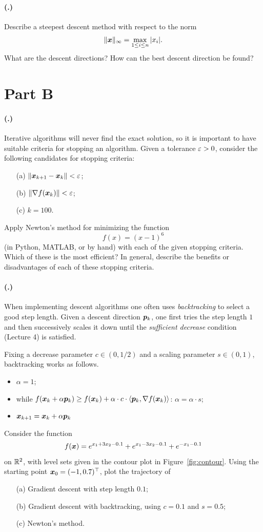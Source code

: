 \documentclass{article}
\newcounter{problemSheetNumber}
\newcounter{problems}
\renewcommand{\problem}{\paragraph{(\theproblemSheetNumber.\theproblems)}\addtocounter{problems}{1}}
\begin{document}
 \problem Describe a steepest descent method with respect to the norm 
 \begin{equation*}
  \Vert {\bm{x}}\Vert_{\infty} = \max_{1\leq i\leq n} |x_i|.
 \end{equation*}
What are the descent directions? How can the best descent direction be found?
 
\section*{Part B}

\problem Iterative algorithms will never find the exact solution, so it is important to have suitable criteria for stopping an algorithm. Given a tolerance $\varepsilon>0$, consider the following candidates for stopping criteria:
\begin{itemize}
 \item[(a)] $\Vert {\bm{x}_{k+1}-\bm{x}_k}\Vert<\varepsilon$;
 \item[(b)] $\Vert {\nabla f(\bm{x}_k)}\Vert<\varepsilon$;
 \item[(c)] $k=100$.
\end{itemize}
Apply Newton's method for minimizing the function
\begin{equation*}
 f(x) = (x-1)^6
\end{equation*}
(in Python, MATLAB, or by hand) with each of the given stopping criteria. Which of these is the most efficient? In general, describe the benefits or disadvantages of each of these stopping criteria. 

\problem When implementing descent algorithms one often uses {\em backtracking} to select a good step length. Given a descent direction $\bm{p}_k$, one first tries the step length $1$ and then successively scales it down until the {\em sufficient decrease} condition (Lecture 4) is satisfied.

Fixing a decrease parameter $c\in (0,1/2)$ and a scaling parameter $s\in (0,1)$, backtracking works as follows.
\begin{itemize}
\item $\alpha=1$;
\item while $f(\bm{x}_k+\alpha \bm{p}_k) \geq f(\bm{x}_k)+\alpha \cdot c\cdot \langle {\bm{p}_k}, {\nabla f(\bm{x}_k)} \rangle$: 
     $\displaystyle \alpha = \alpha\cdot s$;
\item $\displaystyle \bm{x}_{k+1} = \bm{x}_k+\alpha \bm{p}_k$
\end{itemize}

Consider the function
\begin{equation*}
 f(\bm{x}) = e^{x_1+3x_2-0.1}+e^{x_1-3x_2-0.1}+e^{-x_1-0.1}
\end{equation*}
on $\mathbb{R}^2$, with level sets given in the contour plot in Figure~\ref{fig:contour}.
Using the starting point $\bm{x}_0=(-1,0.7)^{\top}$, plot the trajectory of
\begin{itemize}
 \item[(a)] Gradient descent with step length $0.1$;
 \item[(b)] Gradient descent with backtracking, using $c=0.1$ and $s=0.5$;
 \item[(c)] Newton's method.
\end{itemize}
\end{document}
